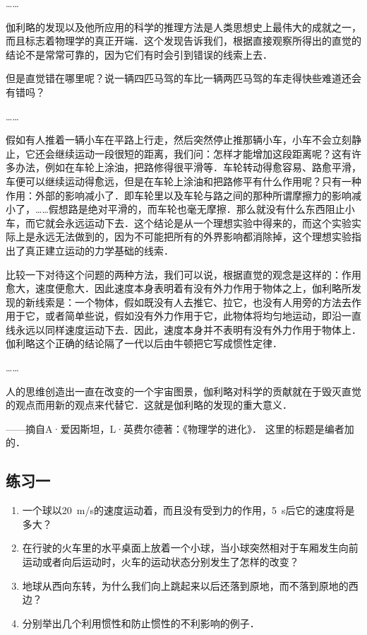 ……

伽利略的发现以及他所应用的科学的推理方法是人类思想史上最伟大的成就之一，而且标志着物理学的真正开端．这个发现告诉我们，根据直接观察所得出的直觉的结论不是常常可靠的，因为它们有时会引到错误的线索上去．

但是直觉错在哪里呢？说一辆四匹马驾的车比一辆两匹马驾的车走得快些难道还会有错吗？

……

假如有人推着一辆小车在平路上行走，然后突然停止推那辆小车，小车不会立刻静止，它还会继续运动一段很短的距离，我们问：怎样才能增加这段距离呢？这有许多办法，例如在车轮上涂油，把路修得很平滑等．车轮转动得愈容易、路愈平滑，车便可以继续运动得愈远，但是在车轮上涂油和把路修平有什么作用呢？只有一种作用：外部的影响减小了．即车轮里以及车轮与路之间的那种所谓摩擦力的影响减小了，……假想路是绝对平滑的，而车轮也毫无摩擦．那么就没有什么东西阻止小车，而它就会永远运动下去．这个结论是从一个理想实验中得来的，而这个实验实际上是永远无法做到的，因为不可能把所有的外界影响都消除掉，这个理想实验指出了真正建立运动的力学基础的线索．

比较一下对待这个问题的两种方法，我们可以说，根据直觉的观念是这样的：作用愈大，速度便愈大．因此速度本身表明着有没有外力作用于物体之上，伽利略所发现的新线索是：一个物体，假如既没有人去推它、拉它，也没有人用旁的方法去作用于它，或者简单些说，假如没有外力作用于它，此物体将均匀地运动，即沿一直线永远以同样速度运动下去．因此，速度本身并不表明有没有外力作用于物体上．伽利略这个正确的结论隔了一代以后由牛顿把它写成惯性定律．

……

人的思维创造出一直在改变的一个宇宙图景，伽利略对科学的贡献就在于毁灭直觉的观点而用新的观点来代替它．这就是伽利略的发现的重大意义．


——摘自A·爱因斯坦，L·英费尔德著：《物理学的进化》．
这里的标题是编者加的．

\subsection*{练习一}
\begin{enumerate}
    \item 一个球以\SI{20}{m/s}的速度运动着，而且没有受到力的作用，\SI{5}{s}后它的速度将是多大？
    \item 在行驶的火车里的水平桌面上放着一个小球，当小球突然相对于车厢发生向前运动或者向后运动时，火车的运动状态分别发生了怎样的改变？
    \item 地球从西向东转，为什么我们向上跳起来以后还落到原地，而不落到原地的西边？
    \item 分别举出几个利用惯性和防止惯性的不利影响的例子．
\end{enumerate}
\newpage
